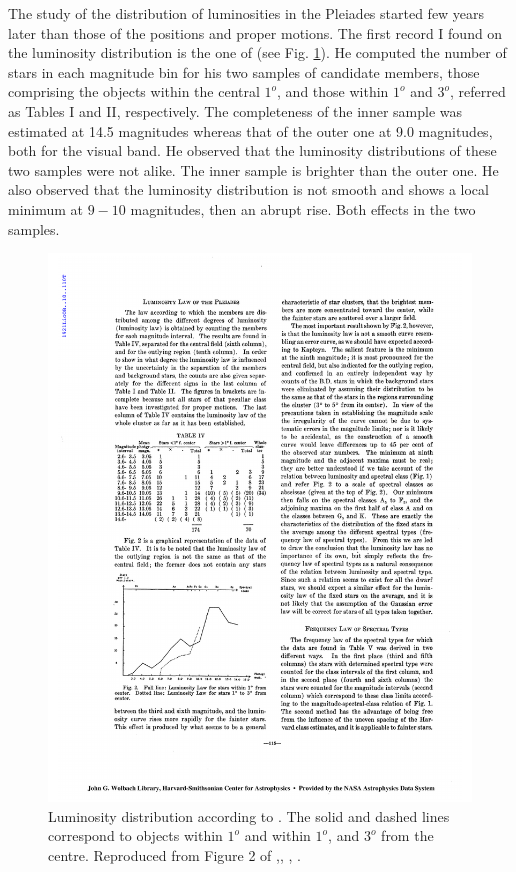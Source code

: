 The study of the distribution of luminosities in the Pleiades started few years later than those of the positions and proper motions. The first record I found on the luminosity distribution is the one of \citet{Trumpler1921} (see Fig. \ref{fig:luminosityTrumpler}). He computed the number of stars in each magnitude bin for his two samples of candidate members, those comprising the objects within the central $1^o$, and those within $1^o$ and $3^o$, referred as Tables I and II, respectively. The completeness of the inner sample was estimated at 14.5 magnitudes whereas that of the outer one at  9.0 magnitudes, both for the visual band. He observed that the luminosity distributions of these two samples were not alike. The inner sample is brighter than the outer one. He also observed that the luminosity distribution is not smooth and shows a local minimum at $9-10$ magnitudes, then an abrupt rise. Both effects in the two samples.

\begin{figure}[ht!]
\begin{center}
\includegraphics[width=\textwidth]{background/Figures/F2_Trumpler1921.pdf}
\caption{Luminosity distribution according to \citet{Trumpler1921}. The solid and dashed lines correspond to objects within $1^o$ and within $1^o$, and $3^o$ from the centre. Reproduced from Figure 2 of \citet{Trumpler1921},\textit{}, , .}
\label{fig:luminosityTrumpler}
\end{center}
\end{figure}

